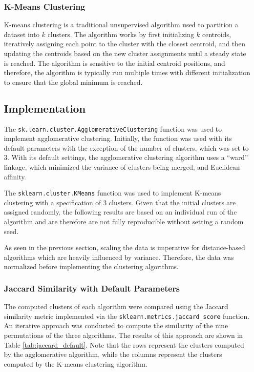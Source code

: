 \documentclass[11pt]{article}
\begin{document}
\subsubsection*{K-Means Clustering}
K-means clustering is a traditional unsupervised algorithm used to partition a dataset into $k$ clusters. The algorithm works by first initializing $k$ centroids, iteratively assigning each point to the cluster with the closest centroid, and then updating the centroids based on the new cluster assignments until a steady state is reached. The algorithm is sensitive to the initial centroid positions, and therefore, the algorithm is typically run multiple times with different initialization to ensure that the global minimum is reached.

\subsection{Implementation}
The \verb|sk.learn.cluster.AgglomerativeClustering| function was used to implement agglomerative clustering. Initially, the function was used with its default parameters with the exception of the number of clusters, which was set to 3. With its default settings, the agglomerative clustering algorithm uses a ``ward'' linkage, which minimized the variance of clusters being merged, and Euclidean affinity.

The \verb|sklearn.cluster.KMeans| function was used to implement K-means clustering with a specification of 3 clusters. Given that the initial clusters are assigned randomly, the following results are based on an individual run of the algorithm and are therefore are not fully reproducible without setting a random seed.

As seen in the previous section, scaling the data is imperative for distance-based algorithms which are heavily influenced by variance. Therefore, the data was normalized before implementing the clustering algorithms.

\subsubsection*{Jaccard Similarity with Default Parameters}
The computed clusters of each algorithm were compared using the Jaccard similarity metric implemented via the \verb|sklearn.metrics.jaccard_score| function. An iterative approach was conducted to compute the similarity of the nine permutations of the three algorithms. The results of this approach are shown in Table \ref{tab:jaccard_default}. Note that the rows represent the clusters computed by the agglomerative algorithm, while the columns represent the clusters computed by the K-means clustering algorithm.
\end{document}
